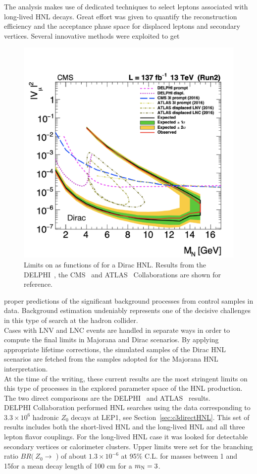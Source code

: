 The analysis makes use of dedicated techniques to select
leptons associated with long-lived HNL decays. Great effort was given
to quantify the reconstruction efficiency and the acceptance phase space
for displaced leptons and secondary vertices. Several innovative
methods were exploited to get
 \begin{figure}
\centering
    \includegraphics[clip,trim=0.3cm 0cm 1.cm 2cm, width=.58\textwidth]{Figures/c6/results/dirac_mu_with_ATLAS.pdf}
\caption{ Limits on \mixparm as
        functions of \mhnl for a Dirac HNL. Results from the
        DELPHI~\cite{Abreu:1996pa}, the CMS~\cite{Sirunyan:2018mtv}
        and ATLAS~\cite{atlas_ll} Collaborations are shown for reference.}
\label{fig:atlas}
\end{figure}
 proper predictions
of the significant background processes from control samples in
data. Background estimation undeniably represents one of the decisive challenges in this
type of search at the hadron collider.\\
Cases with LNV and LNC events are handled in separate ways in order to
compute the final limits
in Majorana and Dirac scenarios. By
applying appropriate lifetime corrections, the simulated samples of
the Dirac HNL scenarios are fetched from the samples adopted for the
Majorana HNL interpretation.\\


At the time of the writing, these current results are the most
stringent limits on this type of processes in the
explored parameter space of the HNL production. 
The two direct comparisons are the DELPHI~\cite{Abreu:1996pa} and
ATLAS~\cite{atlas_ll} results. \\
DELPHI Collaboration performed HNL searches 
  using the data corresponding to $3.3
  \times 10^6$ hadronic
 $Z_0$ decays at LEP1, see Section~\ref{sec:c3directHNL}. This set of results 
  includes both the short-lived HNL
 and the long-lived HNL and all three lepton flavor
 couplings. For the long-lived HNL case it was looked for detectable secondary vertices or calorimeter clusters.
 Upper limits were set for the branching ratio $BR (\: Z_0\rightarrow$ \hnl) of
 about $1.3 \times 10^{-6}$ at 95\% C.L. for \hnl masses between 1 and
 15\GeV for a mean decay length of 100 cm for a $m_\mathrm{N} = 3$\GeV.

